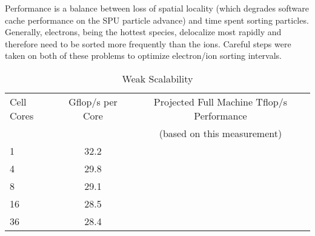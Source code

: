 \documentclass[10pt]{article}
\begin{document}
Performance is a balance between loss of spatial locality (which
degrades software cache performance on the SPU particle advance) and
time spent sorting particles.  Generally, electrons, being the hottest
species, delocalize most rapidly and therefore need to be sorted more
frequently than the ions.  Careful steps were taken on both of these
problems to optimize electron/ion sorting intervals.

\begin{table}
\caption{\label{tbl:ASDS_Weak_Scalability}
Weak Scalability}

\begin{center}
\begin{tabular}{l c c}
\hline
\hline
Cell Cores & Gflop/s per Core & Projected Full Machine Tflop/s Performance \\
 & & (based on this measurement) \\
\hline
1 & 32.2 \\
4 & 29.8 \\
8 & 29.1 \\
16 & 28.5 \\
36 & 28.4 \\
\hline
\end{tabular}
\end{center}
\end{table}

%
%
%
%
%
\end{document}
